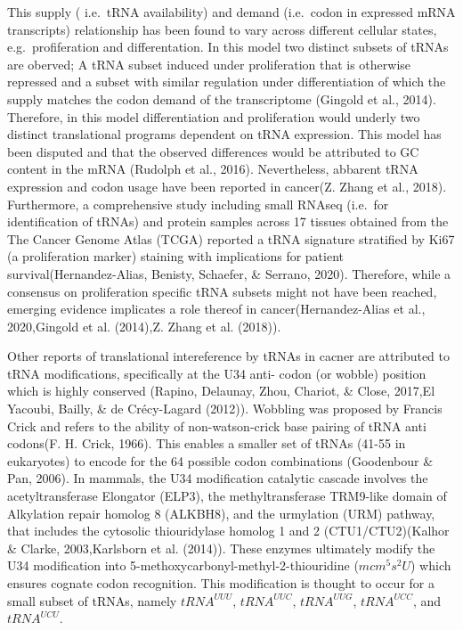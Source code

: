 \documentclass[12pt,openany]{book}
\begin{document}
This supply ( i.e.~tRNA availability) and demand (i.e.~codon in
expressed mRNA transcripts) relationship has been found to vary across
different cellular states, e.g.~profiferation and differentation. In
this model two distinct subsets of tRNAs are oberved; A tRNA subset
induced under proliferation that is otherwise repressed and a subset
with similar regulation under differentiation of which the supply
matches the codon demand of the transcriptome (Gingold et al., 2014).
Therefore, in this model differentiation and proliferation would underly
two distinct translational programs dependent on tRNA expression. This
model has been disputed and that the observed differences would be
attributed to GC content in the mRNA (Rudolph et al., 2016).
Nevertheless, abbarent tRNA expression and codon usage have been
reported in cancer(Z. Zhang et al., 2018). Furthermore, a comprehensive
study including small RNAseq (i.e.~for identification of tRNAs) and
protein samples across 17 tissues obtained from the The Cancer Genome
Atlas (TCGA) reported a tRNA signature stratified by Ki67 (a
proliferation marker) staining with implications for patient
survival(Hernandez-Alias, Benisty, Schaefer, \& Serrano, 2020).
Therefore, while a consensus on proliferation specific tRNA subsets
might not have been reached, emerging evidence implicates a role thereof
in cancer(Hernandez-Alias et al., 2020,Gingold et al. (2014),Z. Zhang et
al. (2018)).

Other reports of translational intereference by tRNAs in cacner are
attributed to tRNA modifications, specifically at the U34 anti- codon
(or wobble) position which is highly conserved (Rapino, Delaunay, Zhou,
Chariot, \& Close, 2017,El Yacoubi, Bailly, \& de Crécy-Lagard (2012)).
Wobbling was proposed by Francis Crick and refers to the ability of
non-watson-crick base pairing of tRNA anti codons(F. H. Crick, 1966).
This enables a smaller set of tRNAs (41-55 in eukaryotes) to encode for
the 64 possible codon combinations (Goodenbour \& Pan, 2006). In
mammals, the U34 modification catalytic cascade involves the
acetyltransferase Elongator (ELP3), the methyltransferase TRM9-like
domain of Alkylation repair homolog 8 (ALKBH8), and the urmylation (URM)
pathway, that includes the cytosolic thiouridylase homolog 1 and 2
(CTU1/CTU2)(Kalhor \& Clarke, 2003,Karlsborn et al. (2014)). These
enzymes ultimately modify the U34 modification into
5-methoxycarbonyl-methyl-2-thiouridine (\(mcm^5s^2U\)) which ensures
cognate codon recognition. This modification is thought to occur for a
small subset of tRNAs, namely \(tRNA^{UUU}\), \(tRNA^{UUC}\),
\(tRNA^{UUG}\), \(tRNA^{UCC}\), and \(tRNA^{UCU}\).
\end{document}
